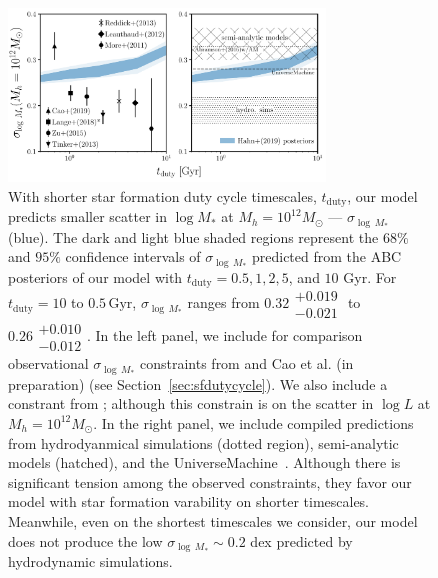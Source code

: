 \documentclass[12pt, letterpaper, preprint, tighten]{aastex62}
\begin{document}
\begin{figure}
\begin{center}
\includegraphics[width=0.75\textwidth]{figs/SHMRscatter_tduty_v2.pdf}
    \caption{With shorter star formation duty cycle timescales, $t_\mathrm{duty}$, 
    our model predicts smaller scatter in $\log M_*$ at $M_h = 10^{12} M_\odot$ --- $\sigma_{\log\,M_*}$ (blue). 
    The dark and light blue shaded regions represent the $68\%$ and $95\%$ confidence 
    intervals of $\sigma_{\log\,M_*}$ predicted from the ABC posteriors of our 
    model with $t_\mathrm{duty} = 0.5, 1, 2, 5$, and $10$ Gyr. For $t_\mathrm{duty} = 10$ 
    to $0.5\,\mathrm{Gyr}$, $\sigma_{\log\,M_*}$ ranges from $0.32\substack{+0.019\\ -0.021}$ to 
    $0.26\substack{+0.010\\-0.012}$. In the left panel, we include for comparison
    observational $\sigma_{\log\,M_*}$ constraints from \cite{yang2009, more2011, leauthaud2012, tinker2013, zu2015} 
    and Cao et al. (in preparation) (see Section~\ref{sec:sfdutycycle}). We also
    include a constrant from \cite{lange2018a}; although this constrain is on the 
    scatter in $\log L$ at $M_h = 10^{12} M_\odot$. In the right panel, we include 
    compiled predictions from hydrodyanmical simulations (dotted region), semi-analytic 
    models (hatched), and the {\sc UniverseMachine}~\citep[][dashed]{behroozi2018}.
    Although there is significant tension among the observed constraints, they 
    favor our model with star formation varability on shorter timescales. Meanwhile, 
    even on the shortest timescales we consider, our model does not produce the low 
    $\sigma_{\log\,M_*} \sim 0.2$ dex predicted by hydrodynamic simulations.
    }
\label{fig:sigMstar_duty}
\end{center}
\end{figure}
\end{document}
